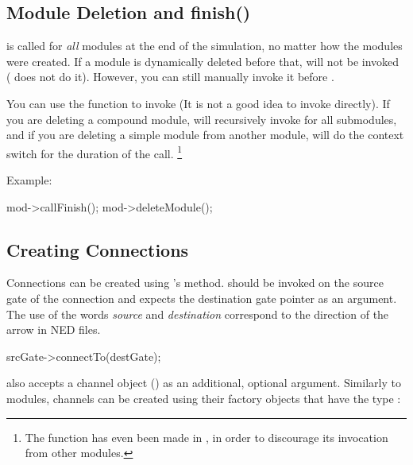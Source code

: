 \subsection{Module Deletion and finish()}
\label{sec:simple-modules:module-deletion-and-finish}

 is called for \textit{all} modules at the end of the
simulation, no matter how the modules were created. If a module is
dynamically deleted before that,  will not be invoked
( does not do it). However, you can still manually
invoke it before .

You can use the  function to invoke 
(It is not a good idea to invoke  directly). If you are
deleting a compound module,  will recursively invoke
 for all submodules, and if you are deleting a simple
module from another module,  will do the context switch
for the duration of the call.
  \footnote{The  function has even been made 
  in , in order to discourage its invocation from
  other modules.}

Example:

\begin{cpp}
mod->callFinish();
mod->deleteModule();
\end{cpp}


\subsection{Creating Connections}
\label{sec:simple-modules:creating-connections}

Connections can be created using 's 
method.  should be invoked on the source gate
of the connection and expects the destination gate pointer as
an argument. The use of the words \textit{source} and \textit{destination}
correspond to the direction of the arrow in NED files.

\begin{cpp}
srcGate->connectTo(destGate);
\end{cpp}

 also accepts a channel object () as an
additional, optional argument. Similarly to modules, channels can be
created using their factory objects that have the type :

